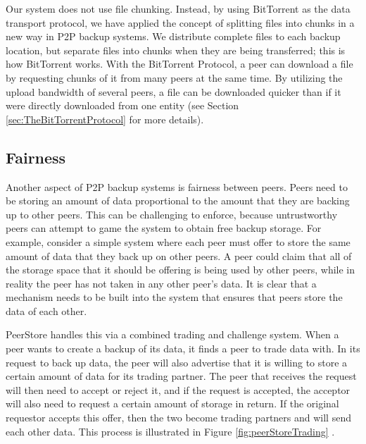 \documentclass[12pt]{report}
\begin{document}
Our system does not use file chunking. Instead, by using BitTorrent as the data transport protocol, we have applied the concept of splitting files into chunks in a new way in P2P backup systems. We distribute complete files to each backup location, but separate files into chunks when they are being transferred; this is how BitTorrent works. With the BitTorrent Protocol, a peer can download a file by requesting chunks of it from many peers at the same time. By utilizing the upload bandwidth of several peers, a file can be downloaded quicker than if it were directly downloaded from one entity (see Section \ref{sec:TheBitTorrentProtocol} for more details).

\subsection{Fairness} \label{sec:BackgroundFairness}
Another aspect of P2P backup systems is fairness between peers. Peers need to be storing an amount of data proportional to the amount that they are backing up to other peers. This can be challenging to enforce, because untrustworthy peers can attempt to game the system to obtain free backup storage. For example, consider a simple system where each peer must offer to store the same amount of data that they back up on other peers. A peer could claim that all of the storage space that it should be offering is being used by other peers, while in reality the peer has not taken in any other peer's data. It is clear that a mechanism needs to be built into the system that ensures that peers store the data of each other.

PeerStore handles this via a combined trading and challenge system. When a peer wants to create a backup of its data, it finds a peer to trade data with. In its request to back up data, the peer will also advertise that it is willing to store a certain amount of data for its trading partner. The peer that receives the request will then need to accept or reject it, and if the request is accepted, the acceptor will also need to request a certain amount of storage in return. If the original requestor accepts this offer, then the two become trading partners and will send each other data. This process is illustrated in Figure \ref{fig:peerStoreTrading} \cite{PeerStore}.
\end{document}
